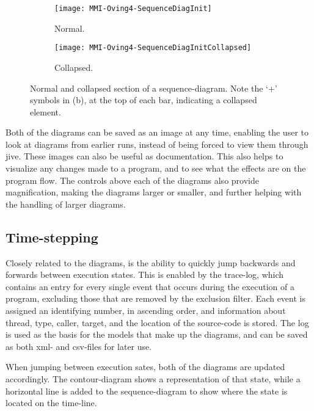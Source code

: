 \begin{figure}[H]
	\centering
	\begin{subfigure}{\textwidth}
		\centering
		\texttt{[image: MMI-Oving4-SequenceDiagInit]}
		\caption{Normal.}
		\label{fig:seqOving4CollapseA}
	\end{subfigure}
	\begin{subfigure}{\textwidth}
		\centering
		\texttt{[image: MMI-Oving4-SequenceDiagInitCollapsed]}
		\caption{Collapsed.}
		\label{fig:seqOving4CollapseB}
	\end{subfigure}
	\caption[Normal and collapsed section of a sequence-diagram.]{Normal and collapsed section of a sequence-diagram. Note the `+' symbols in (b), at the top of each bar, indicating a collapsed element.}
	\label{fig:seqOving4Collapse} 
\end{figure}

Both of the diagrams can be saved as an image at any time, enabling the user to look at diagrams from earlier runs, instead of being forced to view them through \gls{jive}.
These images can also be useful as documentation.
This also helps to visualize any changes made to a program, and to see what the effects are on the program flow.
The controls above each of the diagrams also provide magnification, making the diagrams larger or smaller, and further helping with the handling of larger diagrams.

\subsection{Time-stepping}\label{jiveFeatTimeStep}

Closely related to the diagrams, is the ability to quickly jump backwards and forwards between execution states.
This is enabled by the trace-log, which contains an entry for every single event that occurs during the execution of a program, excluding those that are removed by the exclusion filter.
Each event is assigned an identifying number, in ascending order, and information about thread, type, caller, target, and the location of the source-code is stored.
The log is used as the basis for the models that make up the diagrams, and can be saved as both \acrshort{xml}- and \acrshort{csv}-files for later use.

When jumping between execution sates, both of the diagrams are updated accordingly.
The contour-diagram shows a representation of that state, while a horizontal line is added to the sequence-diagram to show where the state is located on the time-line.

